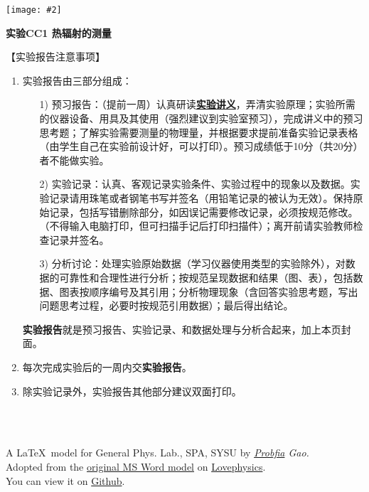\documentclass[11pt,a4paper]{ctexart}
\newcommand{\ExpeName}{实验CC1 热辐射的测量}
\newcommand{\cpic}[2]{
\begin{center}
\texttt{[image: \#2]}
\end{center}
}
\begin{document}
\cpic{0.255}{e1}%
\begin{center}
\LARGE\textbf{{\ExpeName}}
\end{center}
\large{【实验报告注意事项】}
\begin{enumerate}
 \item 实验报告由三部分组成：
 \begin{enumerate}
  \item[1)]预习报告：（提前一周）认真研读\textbf{\uline{实验讲义}}，弄清实验原理；实验所需的仪器设备、用具及其使用（强烈建议到实验室预习），完成讲义中的预习思考题；了解实验需要测量的物理量，并根据要求提前准备实验记录表格（由学生自己在实验前设计好，可以打印）。预习成绩低于10分（共20分）者不能做实验。
  \item[2)]实验记录：认真、客观记录实验条件、实验过程中的现象以及数据。实验记录请用珠笔或者钢笔书写并签名（{\color{red}用铅笔记录的被认为无效}）。{\color{red}保持原始记录，包括写错删除部分，如因误记需要修改记录，必须按规范修改。}（不得输入电脑打印，但可扫描手记后打印扫描件）；离开前请实验教师检查记录并签名。
  \item[3)]分析讨论：处理实验原始数据（学习仪器使用类型的实验除外），对数据的可靠性和合理性进行分析；按规范呈现数据和结果（图、表），包括数据、图表按顺序编号及其引用；分析物理现象（含回答实验思考题，写出问题思考过程，必要时按规范引用数据）；最后得出结论。
 \end{enumerate}
 \textbf{实验报告}就是预习报告、实验记录、和数据处理与分析合起来，加上本页封面。
 \item 每次完成实验后的一周内交\textbf{实验报告}。
 \item 除实验记录外，实验报告其他部分建议双面打印。
\end{enumerate}
\ 
\\
\ 

\begin{flushright}                                                           %
\tiny{
A \LaTeX \ model for General Phys. Lab., SPA, SYSU by {\em \href{https://www.weibo.com/3532532974/profile?rightmod=1&wvr=6&mod=personinfo&is_all=1}{Probfia} Gao.}\\ Adopted from the \href{http://lovephysics.sysu.edu.cn/lib/exe/fetch.php?media=courses:secondlevelzhuhai:report.docx}{original MS Word model} on \href{http://lovephysics.sysu.edu.cn}{Lovephysics}.\\ You can view it on \href{https://github.com/Probfia/SYSU_GPL_C}{Github}.}
\end{flushright}
\end{document}
